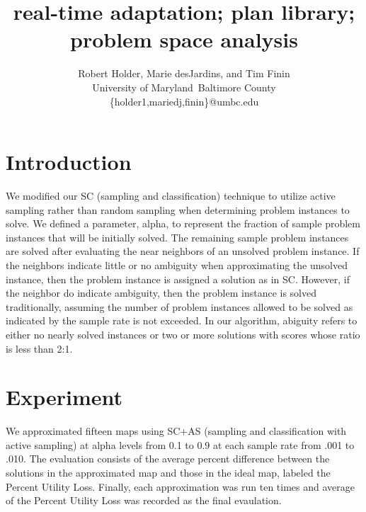 \documentclass[letterpaper]{article}
\begin{document}
\title{real-time adaptation; plan library; problem space analysis}

\author{Robert Holder, Marie desJardins, and Tim Finin\\University of Maryland\
 Baltimore County\\\{holder1,mariedj,finin\}@umbc.edu}



\maketitle

\begin{abstract}
\end{abstract}


\section{Introduction}

We modified our SC (sampling and classification) technique to utilize active sampling rather than random sampling when determining problem instances to solve.  We defined a parameter, alpha, to represent the fraction of sample problem instances that will be initially solved.  The remaining sample problem instances are solved after evaluating the near neighbors of an unsolved problem instance. If the neighbors indicate little or no ambiguity when approximating the unsolved instance, then the problem instance is assigned a solution as in SC.  However, if the neighbor do indicate ambiguity, then the problem instance is solved traditionally, assuming the number of problem instances allowed to be solved as indicated by the sample rate is not exceeded.  In our algorithm, abiguity refers to either no nearly solved instances or two or more solutions with scores whose ratio is less than 2:1.

\section{Experiment}
We approximated fifteen maps using SC+AS (sampling and classification with active sampling) at alpha levels from 0.1 to 0.9 at each sample rate from .001 to .010.  The evaluation consists of the average percent difference between the solutions in the approximated map and those in the ideal map, labeled the Percent Utility Loss.   Finally, each approximation was run ten times and average of the Percent Utility Loss was recorded as the final evaulation.
\end{document}
